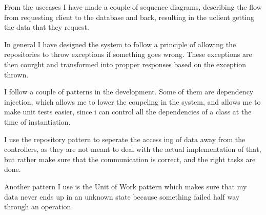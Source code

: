 From the usecases I have made a couple of sequence diagrams, describing the flow
from requesting client to the database and back, resulting in the uclient
getting the data that they request. 

In general I have designed the system to follow a principle of allowing the
repositories to throw exceptions if something goes wrong. These exceptions are
then courght and transformed into propper responses based on the exception thrown.

I follow a couple of patterns in the development. Some of them are dependency
injection, which allows me to lower the coupeling in the system, and allows me
to make unit tests easier, since i can control all the dependencies of a class
at the time of instantiation.

I use the repository pattern to seperate the access ing of data away from the
controllers, as they are not meant to deal with the actual implementation of
that, but rather make sure that the communication is correct, and the right
tasks are done.

Another pattern I use is the Unit of Work pattern which makes sure that my data
never ends up in an unknown state because something failed half way through an
operation. 

